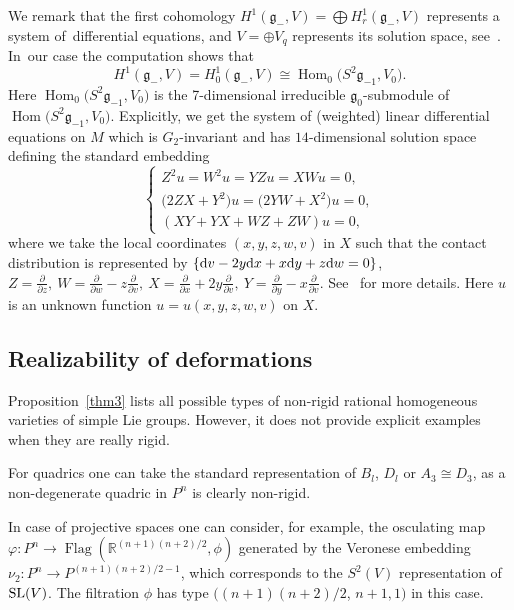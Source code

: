 \documentclass[pdftex]{sigma}%
\newcommand{\R}{\mathbb R}
\newcommand{\g}{\mathfrak g}
\newcommand{\Flag}{\operatorname{Flag}}
\newcommand{\Hom}{\operatorname{Hom}}
\numberwithin{equation}{section}
\begin{document}
We remark that the first cohomology $H^1(\g_{-},V) =\bigoplus H^1_{r}(\g_{-},V)$ represents a system of~differential equations, and $V=\oplus V_{q}$ represents its solution space, see~\cite{Mor2006}. In~our case the computation shows that
\[
H^1(\g_{-},V)=H^1_{0}(\g_{-},V)\cong \Hom_{0}\big(S^2\g_{-1},V_0\big).
\]
Here $\Hom_{0}\big(S^2\g_{-1},V_0\big)$ is the 7-dimensional irreducible $\g_{0}$-submodule of $\Hom\big(S^2\g_{-1},V_{0}\big)$. Exp\-li\-citly, we get the system of (weighted) linear differential equations on $M$ which is $G_2$-invariant and has $14$-dimensional solution space defining the standard embedding
\[
\begin{cases}
Z^2u = W^2u = YZu = XWu =0, \\
\big(2ZX+Y^2\big)u = \big(2YW+X^2\big)u =0, \\
(XY+YX+WZ+ZW)u =0,
\end{cases}
\]
where we take the local coordinates $(x,y,z,w,v)$ in $X$ such that
the contact distribution is represented by $\{ {\rm d}v-2y{\rm d}x+x{\rm d}y+z{\rm d}w=0 \}$, \
$Z=\frac{\partial}{\partial z},\ W=\frac{\partial}{\partial w}-z\frac{\partial}{\partial v},\
X=\frac{\partial}{\partial x}+2y\frac{\partial}{\partial v},\
Y=\frac{\partial}{\partial y}-x\frac{\partial}{\partial v}$.
See~\cite{IMT} for more details. Here
$u$ is an unknown function $u=u(x,y,z,w,v)$ on $X$.


\subsection{Realizability of deformations}
Proposition~\ref{thm3} lists all possible types of non-rigid rational homogeneous varieties of simple Lie groups. However, it does not provide explicit examples when they are really rigid.

For quadrics one can take the standard representation of $B_l$, $D_l$ or $A_3\cong D_3$, as a non-degenerate quadric in $P^n$ is clearly non-rigid.

In case of projective spaces one can consider, for example, the osculating map $\varphi\colon P^n\to \Flag\left(\R^{(n+1)(n+2)/2},\phi\right)$ generated by the Veronese embedding $\nu_2\colon P^n\to P^{(n+1)(n+2)/2-1}$, which corresponds to the $S^2(V)$ representation of ${\rm SL}(V)$. The filtration $\phi$ has type $((n+1)(n+2)/2$, $n+1,1)$ in this case.
\end{document}
